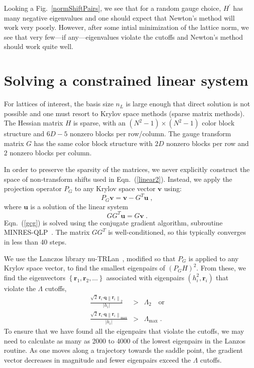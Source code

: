 \documentclass[preprint,aps,prd]{revtex4-2}
\newcommand{\be}{\begin{equation}}
\newcommand{\eq}{\end{equation}}
\newcommand{\heigen}{h}
\begin{document}
Looking a Fig.~\ref{normShiftPairs}, we see that for a random
gauge choice, $H^\prime$ has many
negative eigenvalues and one should
expect that Newton's method will work very poorly.
However, after some intial minimization of the lattice
norm, we see that very few---if any---eigenvalues violate the cutoffs
and Newton's method should work quite well.


\section{Solving a constrained linear system}
\label{krylov}

For lattices of interest, the basis size $n_L$ is large enough
that direct solution is not possible and one must resort to Krylov
space methods (sparse matrix methods).
The Hessian matrix $H$ is sparse, with an $(N^2-1)\times(N^2-1)$
color block structure and $6D-5$ nonzero blocks per row/column.
The gauge transform matrix $G$ has the same color block structure
with $2 D$ nonzero blocks per row and $2$ nonzero blocks per column.

In order to preserve the sparsity of the matrices, we never
explicitly construct the space of non-transform shifts used in
Eqn.~(\ref{linear2}).  Instead, we apply the projection
operator $P_G$ to any Krylov space vector $\mathbf{v}$ using:
\be
    P_G \mathbf{v} = \mathbf{v} - G^T \mathbf{u} \; ,
\eq
where $\mathbf{u}$ is a solution of the linear system
\be
  G G^T \mathbf{u} = G \mathbf{v} \; .\label{gcg}
\eq
Eqn.~(\ref{gcg}) is solved using the conjugate gradient
algorithm, subroutine MINRES-QLP~\cite{choi_algorithm_2014}.
The matrix $G G^T$ is well-conditioned, so this typically converges
in less than 40 steps.

We use the Lanczos library nu-TRLan~\cite{yamazaki_adaptive_2010},
modified so that $P_G$ is applied to any Krylov space vector, to
find the smallest eigenpairs of $\left(P_G H\right)^2$.  From these, we find
the eigenvectors $\left\{\mathbf{r}_1, \mathbf{r}_2, \ldots\right\}$
associated with eigenpairs $\left(\heigen_i^2, \mathbf{r}_i\right)$
that violate the $\Lambda$ cutoffs,
%
\begin{eqnarray}
   \frac{\sqrt{2}\, \mathbf{r}_i \mathbf{\cdot} \mathbf{q}
   \left\lVert \mathbf{r}_i\right\rVert_2}{\left|\heigen_i\right| }
     &>& \Lambda_2  \quad\mbox{or} \\
   \frac{\sqrt{2}\, \mathbf{r}_i\mathbf{\cdot} \mathbf{q}
   \left\lVert \mathbf{r}_i\right\rVert_\mathrm{max}}{\left|\heigen_i\right| }
     &>& \Lambda_\mathrm{max} \; .
\end{eqnarray}
%
To ensure that we have found all the eigenpairs that violate the cutoffs,
we may need to calculate as many as 2000 to 4000 of the lowest eigenpairs
in the Lanzos routine.  As one moves along a trajectory towards the
saddle point, the gradient vector decreases in magnitude and fewer eigenpairs
exceed the $\Lambda$ cutoffs.
\end{document}
